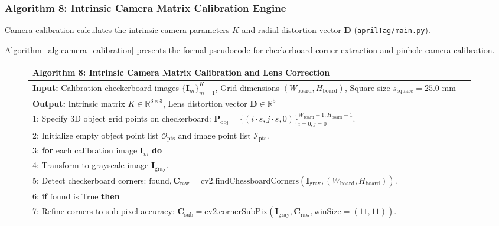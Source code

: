 \subsubsection{Algorithm 8: Intrinsic Camera Matrix Calibration Engine}
Camera calibration calculates the intrinsic camera parameters $K$ and radial distortion vector $\mathbf{D}$ (\texttt{aprilTag/main.py}).

Algorithm~\ref{alg:camera_calibration} presents the formal pseudocode for checkerboard corner extraction and pinhole camera calibration.

\begin{figure}[htbp]
\centering
\begin{minipage}{0.92\textwidth}
\small
\setlength{\extrarowheight}{2pt}
\begin{tabular}{|p{0.96\linewidth}|}
\hline
\textbf{Algorithm 8: Intrinsic Camera Matrix Calibration and Lens Correction} \\
\hline
{\small\sffamily \textbf{Input:} Calibration checkerboard images $\{\mathbf{I}_m\}_{m=1}^K$, Grid dimensions $(W_{\text{board}}, H_{\text{board}})$, Square size $s_{\text{square}} = 25.0\text{ mm}$} \\
{\small\sffamily \textbf{Output:} Intrinsic matrix $K \in \mathbb{R}^{3 \times 3}$, Lens distortion vector $\mathbf{D} \in \mathbb{R}^5$} \\
{\small 1: Specify 3D object grid points on checkerboard: $\mathbf{P}_{\text{obj}} = \{(i \cdot s, j \cdot s, 0)\}_{i=0, j=0}^{W_{\text{board}}-1, H_{\text{board}}-1}$.} \\
{\small 2: Initialize empty object point list $\mathcal{O}_{\text{pts}}$ and image point list $\mathcal{I}_{\text{pts}}$.} \\
{\small 3: \textbf{for} each calibration image $\mathbf{I}_m$ \textbf{do}} \\
{\small 4: \hspace{1em} Transform to grayscale image $\mathbf{I}_{\text{gray}}$.} \\
{\small 5: \hspace{1em} Detect checkerboard corners: $\text{found}, \mathbf{C}_{\text{raw}} = \text{cv2.findChessboardCorners}(\mathbf{I}_{\text{gray}}, (W_{\text{board}}, H_{\text{board}}))$.} \\
{\small 6: \hspace{1em} \textbf{if} $\text{found}$ is True \textbf{then}} \\
{\small 7: \hspace{2em} Refine corners to sub-pixel accuracy: $\mathbf{C}_{\text{sub}} = \text{cv2.cornerSubPix}(\mathbf{I}_{\text{gray}}, \mathbf{C}_{\text{raw}}, \text{winSize}=(11,11))$.} \\

\end{tabular}
\end{minipage}
\end{figure}
